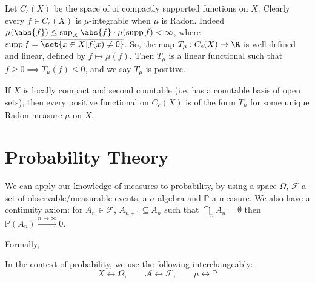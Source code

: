 \documentclass{article}
\newcommand{\1}[1]{\mathbbm{1}_{#1}}
\newcommand{\Prob}{\mathbb{P}}
\DeclareMathOperator{\supp}{supp}
\begin{document}
Let $C_c(X)$ be the space of of compactly supported functions on $X$.
Clearly every $f \in C_c(X)$ is $\mu$-integrable when $\mu$ is Radon.
Indeed $\mu(\abs{f}) \leq \sup_X \abs{f} \cdot \mu(\supp f) < \infty$, where $\supp f = \overline{\set{x \in X | f(x) \neq 0}}$.
So, the map $T_\mu: C_c(X) \to \R$ is well defined and linear, defined by $f \mapsto \mu(f)$.
Then $T_\mu$ is a linear functional such that $f \geq 0 \implies T_\mu(f) \leq 0$, and we say $T_\mu$ is positive.

\begin{thm}
    If $X$ is locally compact and second countable (i.e. has a countable basis of open sets), then every positive functional on $C_c(X)$ is of the form $T_\mu$ for some unique Radon measure $\mu$ on $X$.
\end{thm}

\section{Probability Theory}
We can apply our knowledge of measures to probability, by using a space $\Omega$, $\mathcal{F}$ a set of observable/measurable events, a $\sigma$ algebra and $\mathbb{P}$ a \hyperlink{def:measure}{measure}.
We also have a continuity axiom: for $A_n \in \mathcal{F}$, $A_{n+1} \subseteq A_n$ such that $\bigcap_n A_n = \emptyset$ then $\Prob(A_n) \xrightarrow{n \to \infty} 0$.

Formally,



\begin{notation}
    In the context of probability, we use the following interchangeably:
    \begin{equation*}
        X \longleftrightarrow \Omega, \qquad \mathcal{A} \longleftrightarrow \mathcal{F}, \qquad \mu \longleftrightarrow \Prob
    \end{equation*}
\end{notation}
\end{document}
